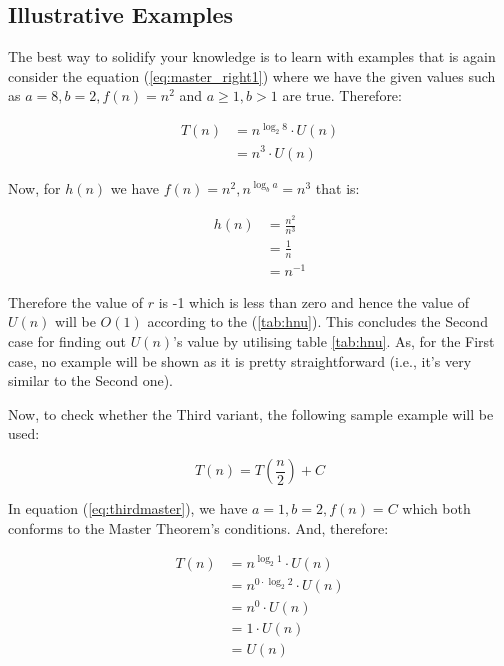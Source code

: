 \documentclass[a4paper,12pt]{article}
\theoremstyle{definition}
\begin{document}
    \subsection{Illustrative Examples}

    \noindent
    The best way to solidify your knowledge is to learn with examples that is again consider the
    equation (\ref{eq:master_right1}) where we have the given values such as $a = 8, b = 2, f(n) = n^2$
    and $a \geq 1, b > 1$ are true.
    Therefore:

    \begin{align*}
        T(n) & = n^{\log_2 8} \cdot U(n) \\
        & = n^3 \cdot U(n)
    \end{align*}

    \noindent
    Now, for $h(n)$ we have $f(n) = n^2, n^{\log_b a} = n^3$ that is:

    \begin{align*}
        h(n) & = \frac{n^2}{n^3} \\
        & = \frac{1}{n}     \\
        & = n^{-1}
    \end{align*}

    \noindent
    Therefore the value of $r$ is -1 which is less than zero and hence the value of $U(n)$ will be $O(1)$ according
    to the (\ref{tab:hnu}).
    This concludes the Second case for finding out $U(n)$'s value by utilising table {\ref{tab:hnu}}.
    As, for the First case, no example will be shown as it is pretty straightforward
    (i.e., it's very similar to the Second one).

    Now, to check whether the Third variant, the following sample example will be used:

    \begin{equation}
        \label{eq:thirdmaster}
        T(n) = T\left(\frac{n}{2}\right) + C
    \end{equation}

    \noindent
    In equation (\ref{eq:thirdmaster}), we have $a = 1,b = 2,f(n) = C$ which both conforms to the
    Master Theorem's conditions.
    And, therefore:

    \begin{align*}
        T(n) & = n^{\log_2 1} \cdot U(n)         \\
        & = n^{0 \cdot \log_2 2} \cdot U(n) \\
        & = n^0 \cdot U(n)                  \\
        & = 1 \cdot U(n)                    \\
        & = U(n)
    \end{align*}
\end{document}
